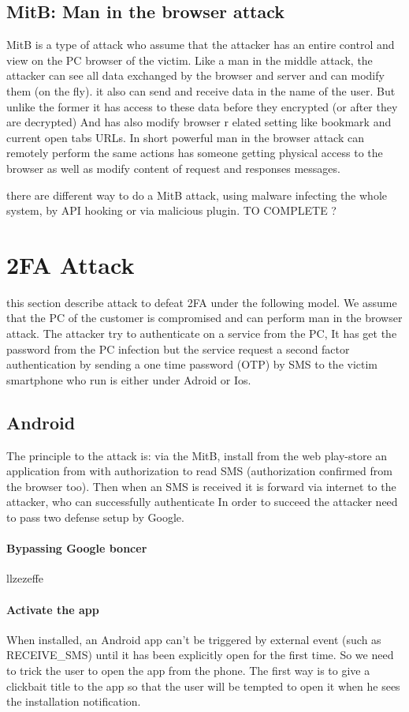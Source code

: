 \documentclass[11pt, a4paper,twocolumn]{article}
\begin{document}
\subsection{MitB: Man in the browser attack}
MitB is a type of attack who assume that the attacker has an entire control and view on the PC browser of the victim. Like a man in the middle attack, the attacker can see all data 
exchanged by the browser and server and can modify them (on the fly). it also can send and receive data in the name of the user. But unlike the former it has access to these data before they encrypted (or after they are decrypted) And has also modify browser r elated setting like bookmark and current open tabs URLs. In short powerful man in the browser attack can remotely perform the same actions has someone getting physical access to the browser as well as modify content of request and responses messages.

there are different way to do a MitB attack, using malware infecting the whole system, by API hooking or via malicious plugin. TO COMPLETE ?
\section{2FA Attack}
 this section describe attack to defeat 2FA under the following model. We assume that the PC of the customer is compromised and can perform man in the browser attack. The attacker try to authenticate on a service from the PC, It has get the password from the PC infection but the service request a second factor authentication by sending a one time password (OTP) by SMS to the victim smartphone who run is either under Adroid or Ios. 
\subsection{Android}
The principle to the attack is: via the MitB, install from the web play-store  an application from with authorization to read SMS (authorization confirmed from the browser too). Then when an SMS is received it is forward via internet to the attacker, who can successfully authenticate In order to succeed the attacker need to pass two defense setup by Google.

\paragraph{Bypassing Google boncer} llzezeffe

\paragraph{Activate the app} When installed, an Android app can't be triggered by external event (such as RECEIVE\_SMS) until it has been explicitly open for the first time. So we need to trick the user to open the app from the phone. The 
first way is to give a clickbait title to the app so that the user will be tempted to open it when he sees the installation notification.
\end{document}
